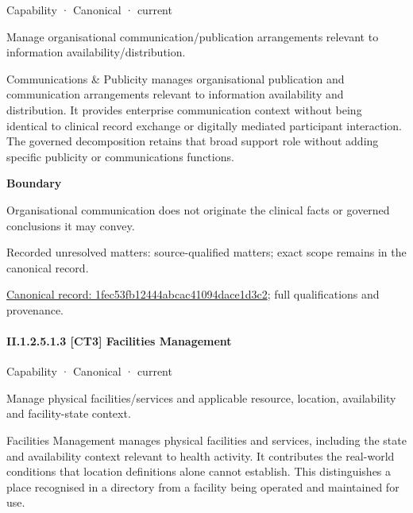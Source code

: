 \label{element:1fec53fb12444abcac41094dace1d3c2}
{\small Capability · Canonical · current}\par

Manage organisational communication/publication arrangements relevant to information availability/distribution.



Communications \& Publicity manages organisational publication and communication arrangements relevant to information availability and distribution. It provides enterprise communication context without being identical to clinical record exchange or digitally mediated participant interaction. The governed decomposition retains that broad support role without adding specific publicity or communications functions.



\textbf{Boundary}



Organisational communication does not originate the clinical facts or governed conclusions it may convey.


{\small Recorded unresolved matters: source-qualified matters; exact scope remains in the canonical record.}\par
{\footnotesize \href{../../../../../../../continuum/strategy/capability/1fec53fb12444abcac41094dace1d3c2.md}{Canonical record: 1fec53fb12444abcac41094dace1d3c2}; full qualifications and provenance.}\par
\paragraph*{II.1.2.5.1.3 [CT3] Facilities Management}
\label{navigation:II.1.2.5.1.3}

\label{element:9c82e623bd174409b90d24af6b58ebf0}
{\small Capability · Canonical · current}\par

Manage physical facilities/services and applicable resource, location, availability and facility-state context.



Facilities Management manages physical facilities and services, including the state and availability context relevant to health activity. It contributes the real-world conditions that location definitions alone cannot establish. This distinguishes a place recognised in a directory from a facility being operated and maintained for use.



